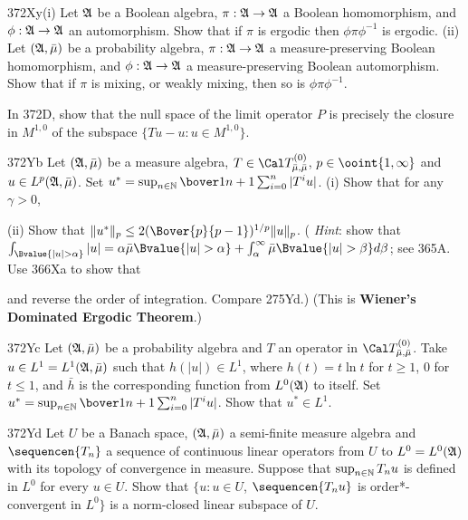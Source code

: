 {\spheader 372Xy(i) Let $\frak A$ be a Boolean algebra,
$\pi:\frak A\to\frak A$ a Boolean homomorphism, and
$\phi:\frak A\to\frak A$ an automorphism.   Show that if
$\pi$ is ergodic then $\phi\pi\phi^{-1}$ is ergodic.
(ii) Let $(\frak A,\bar\mu)$ be a probability algebra,
$\pi:\frak A\to\frak A$ a measure-preserving Boolean homomorphism, and
$\phi:\frak A\to\frak A$ a measure-preserving
Boolean automorphism.   Show that if
$\pi$ is mixing, or weakly mixing, then so is $\phi\pi\phi^{-1}$.

In 372D, show that the null space of the limit operator $P$ is precisely
the closure in $M^{1,0}$ of the subspace $\{Tu-u:u\in M^{1,0}\}$.

\spheader 372Yb Let $(\frak A,\bar\mu)$ be a measure algebra,
$T\in\Cal T^{(0)}_{\bar\mu,\bar\mu}$, $p\in\ooint{1,\infty}$ and
$u\in L^p(\frak A,\bar\mu)$.  Set
$u^*=\sup_{n\in\Bbb N}\bover1{n+1}\sum_{i=0}^n|T^iu|$.   (i) Show that
for any $\gamma>0$,


\noindent{}   (ii)
Show that $\|u^*\|_p\le 2(\Bover{p}{p-1})^{1/p}\|u\|_p$.   ({\it
Hint\/}: show that
$\int_{\Bvalue{|u|>\alpha}}|u|=\alpha\bar\mu\Bvalue{|u|>\alpha}
+\int_{\alpha}^{\infty}\bar\mu\Bvalue{|u|>\beta}d\beta$;  see 365A.
Use 366Xa to show that


\noindent and reverse the order of integration.   Compare
275Yd.)   (This is {\bf Wiener's Dominated Ergodic Theorem}.)

\spheader 372Yc Let $(\frak A,\bar\mu)$ be a probability algebra and $T$
an operator in $\Cal T^{(0)}_{\bar\mu,\bar\mu}$.   Take
$u\in L^1=L^1(\frak A,\bar\mu)$ such that $h(|u|)\in L^1$, where
$h(t)=t\ln t$ for
$t\ge 1$, $0$ for $t\le 1$, and $\bar h$ is the corresponding function
from $L^0(\frak A)$ to itself.   Set
$u^*=\sup_{n\in\Bbb N}\bover1{n+1}\sum_{i=0}^n|T^iu|$.   Show that
$u^*\in L^1$.   

\spheader 372Yd Let $U$ be a Banach space, $(\frak A,\bar\mu)$ a
semi-finite measure algebra and $\sequencen{T_n}$ a sequence of
continuous linear operators from $U$ to $L^0=L^0(\frak A)$ with its
topology of convergence in measure.   Suppose that
$\sup_{n\in\Bbb N}T_nu$ is defined in $L^0$ for every $u\in U$.
Show that $\{u:u\in U$, $\sequencen{T_nu}$ is order*-convergent in $L^0\}$
is a norm-closed linear subspace of $U$.

}
